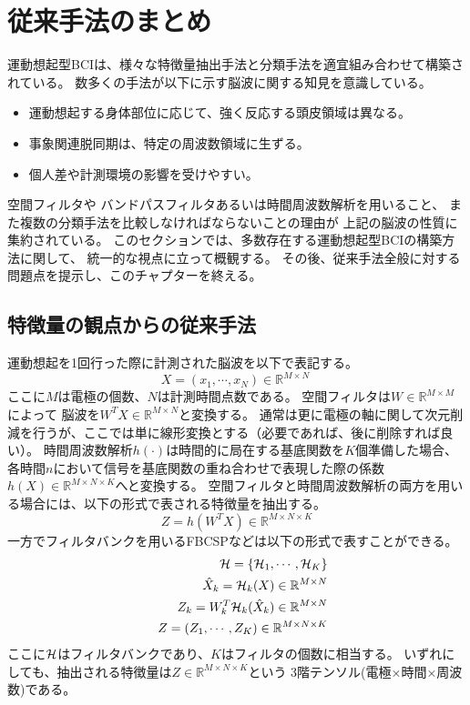 \section{\mc 従来手法のまとめ}
運動想起型BCIは、様々な特徴量抽出手法と分類手法を適宜組み合わせて構築されている。
数多くの手法が以下に示す脳波に関する知見を意識している。
\begin{itemize}
    \item 運動想起する身体部位に応じて、強く反応する頭皮領域は異なる。
    \item 事象関連脱同期は、特定の周波数領域に生ずる。
    \item 個人差や計測環境の影響を受けやすい。
\end{itemize}
空間フィルタや
バンドパスフィルタあるいは時間周波数解析を用いること、
また複数の分類手法を比較しなければならないことの理由が
上記の脳波の性質に集約されている。
このセクションでは、多数存在する運動想起型BCIの構築方法に関して、
統一的な視点に立って概観する。
その後、従来手法全般に対する問題点を提示し、このチャプターを終える。

\subsection{\mc 特徴量の観点からの従来手法}
運動想起を1回行った際に計測された脳波を以下で表記する。
\begin{equation}
    X =(x_1, \cdots, x_N)\in \mathbb{R}^{M \times N}\    
\end{equation}
ここに\(M\)は電極の個数、\(N\)は計測時間点数である。
空間フィルタは\(W\in \mathbb R^{M \times M}\)によって
脳波を\(W^TX \in \mathbb R^{M \times N}\)と変換する。
通常は更に電極の軸に関して次元削減を行うが、ここでは単に線形変換とする（必要であれば、後に削除すれば良い）。
時間周波数解析\(h(\cdot)\)は時間的に局在する基底関数を\(K\)個準備した場合、
各時間\(n\)において信号を基底関数の重ね合わせで表現した際の係数\(h(X) \in \mathbb R^{M \times N \times K}\)へと変換する。
空間フィルタと時間周波数解析の両方を用いる場合には、以下の形式で表される特徴量を抽出する。
\begin{equation}
    Z = h(W^TX) \in \mathbb R^{M\times N \times K}
    \label{eq:EEGfeatures}
\end{equation} 
一方でフィルタバンクを用いるFBCSPなどは以下の形式で表すことができる。
\begin{eqnarray}
    && {\cal H}  =  \{ {\cal H}_1,\cdots, {\cal H}_K \} \\
    && \hat X_k  = {\cal H}_k(X) \in \mathbb R^{M\times N} \\
    && Z_k  = W_k^T{\cal H}_k(\hat X_k) \in \mathbb R^{M\times N} \\
    && Z  =  (Z_1,\cdots, Z_K) \in \mathbb R^{M\times N \times K}
    \label{eq:EEGfeaturesbandpass}
\end{eqnarray} 
ここに\({\cal H}\)はフィルタバンクであり、\(K\)はフィルタの個数に相当する。
いずれにしても、抽出される特徴量は\(Z\in \mathbb R^{M\times N \times K}\)という
3階テンソル(電極×時間×周波数)である。

